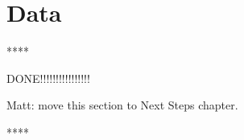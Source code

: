 % 
% 
% 


\section{Data}
\label{sec:Data}

**** 

DONE!!!!!!!!!!!!!!!!

Matt: move this section to Next Steps chapter.

****

